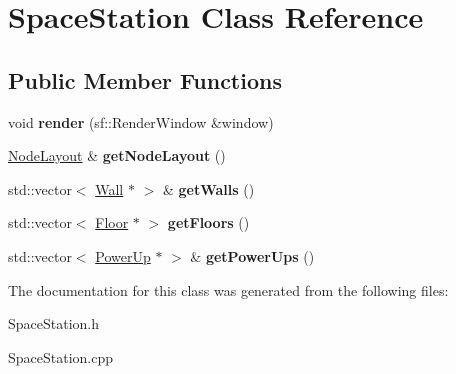 \hypertarget{class_space_station}{}\section{Space\+Station Class Reference}
\label{class_space_station}
\subsection*{Public Member Functions}
\begin{DoxyCompactItemize}
\item 
\mbox{\label{class_space_station_a824f72a1cc84e640f8db8be290227cbe}} 
void {\bfseries render} (sf\+::\+Render\+Window \&window)
\item 
\mbox{\label{class_space_station_a448dc37ced5e9954461899ddebc8a69e}} 
\mbox{\hyperlink{class_node_layout}{Node\+Layout}} \& {\bfseries get\+Node\+Layout} ()
\item 
\mbox{\label{class_space_station_a3d7dd73588dac0f1c9ae662526c7e29f}} 
std\+::vector$<$ \mbox{\hyperlink{class_wall}{Wall}} $\ast$ $>$ \& {\bfseries get\+Walls} ()
\item 
\mbox{\label{class_space_station_a8a15fe86e9b1639d320951e5914e8120}} 
std\+::vector$<$ \mbox{\hyperlink{class_floor}{Floor}} $\ast$ $>$ {\bfseries get\+Floors} ()
\item 
\mbox{\label{class_space_station_a32f408563c74832a7e5b86f2f2edd0d4}} 
std\+::vector$<$ \mbox{\hyperlink{class_power_up}{Power\+Up}} $\ast$ $>$ \& {\bfseries get\+Power\+Ups} ()
\end{DoxyCompactItemize}


The documentation for this class was generated from the following files\+:\begin{DoxyCompactItemize}
\item 
Space\+Station.\+h\item 
Space\+Station.\+cpp\end{DoxyCompactItemize}
